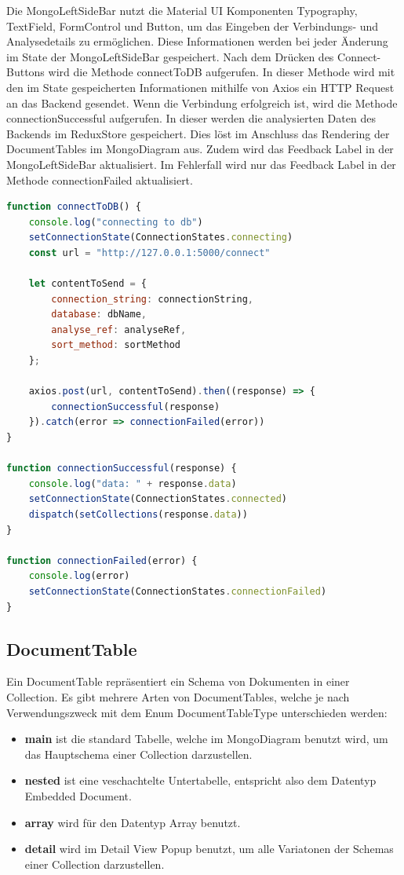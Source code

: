 Die  MongoLeftSideBar nutzt die Material UI Komponenten Typography, TextField, FormControl und Button, um das Eingeben der Verbindungs- und Analysedetails zu ermöglichen.
Diese Informationen werden bei jeder Änderung im State der MongoLeftSideBar gespeichert.
Nach dem Drücken des Connect-Buttons wird die Methode connectToDB aufgerufen.
In dieser Methode wird mit den im State gespeicherten Informationen mithilfe von Axios ein HTTP Request an das Backend gesendet.
Wenn die Verbindung erfolgreich ist, wird die Methode connectionSuccessful aufgerufen.
In dieser werden die analysierten Daten des Backends im ReduxStore gespeichert.
Dies löst im Anschluss das Rendering der DocumentTables im MongoDiagram aus.
Zudem wird das Feedback Label in der MongoLeftSideBar aktualisiert.
Im Fehlerfall wird nur das Feedback Label in der Methode connectionFailed aktualisiert.


\begin{lstlisting}[language=JavaScript, caption={MongoLeftSideBar.connectToDB},label={lst:mongo_left_side_bar_connect_to_db}]
function connectToDB() {
    console.log("connecting to db")
    setConnectionState(ConnectionStates.connecting)
    const url = "http://127.0.0.1:5000/connect"

    let contentToSend = {
        connection_string: connectionString,
        database: dbName,
        analyse_ref: analyseRef,
        sort_method: sortMethod
    };

    axios.post(url, contentToSend).then((response) => {
        connectionSuccessful(response)
    }).catch(error => connectionFailed(error))
}

function connectionSuccessful(response) {
    console.log("data: " + response.data)
    setConnectionState(ConnectionStates.connected)
    dispatch(setCollections(response.data))
}

function connectionFailed(error) {
    console.log(error)
    setConnectionState(ConnectionStates.connectionFailed)
}
\end{lstlisting}

\subsection{DocumentTable}
\label{sub:fe_document_table}

Ein DocumentTable repräsentiert ein Schema von Dokumenten in einer Collection.
Es gibt mehrere Arten von DocumentTables, welche je nach Verwendungszweck mit dem Enum DocumentTableType unterschieden werden:
\begin{itemize}
    \item \textbf{main} ist die standard Tabelle, welche im MongoDiagram benutzt wird, um das Hauptschema einer Collection darzustellen.
    \item \textbf{nested} ist eine veschachtelte Untertabelle, entspricht also dem Datentyp Embedded Document.
    \item \textbf{array} wird für den Datentyp Array benutzt.
    \item \textbf{detail} wird im Detail View Popup benutzt, um alle Variatonen der Schemas einer Collection darzustellen.
\end{itemize}

